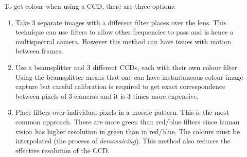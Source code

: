 \documentclass{article}
\begin{document}
To get colour when using a CCD, there are three options:
\begin{enumerate}
	\item Take 3 separate images with a different filter places over the lens. This technique can use filters to allow other frequencies to pass and is hence a multispectral camera. However this method can have issues with motion between frames.
	\item Use a beamsplitter and 3 different CCDs, each with their own colour filter. Using the beamsplitter means that one can have instantaneous colour image capture but careful calibration is required to get exact correspondence between pixels of 3 cameras and it is 3 times more expensive.
	\item Place filters over individual pixels in a mosaic pattern. This is the most common approach. 
		There are more green than red/blue filters since human vision has higher resolution in green than in red/blue. 
		The colours must be interpolated (the process of {\it demosaicing}).
		This method also reduces the effective resolution of the CCD.
\end{enumerate}
\end{document}
